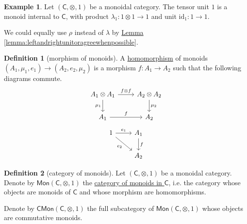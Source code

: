 \documentclass[a4paper,10pt]{scrreprt}
\newcommand{\defn}[1]{\ul{#1}}
\theoremstyle{definition}
\newtheorem{definition}{Definition}[section]
\newtheorem{example}{Example}[section]
\theoremstyle{plain}
\theoremstyle{remark}
\begin{document}
\begin{example}
  \label{eg:tensorunitisinternalmonoid}
  Let $(\mathsf{C}, \otimes, 1)$ be a monoidal category. The tensor unit $1$ is a monoid internal to $\mathsf{C}$, with product $\lambda_{1}\colon 1 \otimes 1 \to 1$ and unit $\mathrm{id}_{1}\colon 1 \to 1$.

  We could equally use $\rho$ instead of $\lambda$ by \hyperref[lemma:leftandrightunitoragreewhenpossible]{Lemma \ref*{lemma:leftandrightunitoragreewhenpossible}}.
\end{example}

\begin{definition}[morphism of monoids]
  \label{def:homomorphismofmonoids}
  A \defn{homomorphism} of monoids $(A_{1}, \mu_{1}, e_{1}) \to (A_{2}, e_{2}, \mu_{2})$ is a morphism $f\colon A_{1} \to A_{2}$ such that the following diagrams commute.
  \begin{equation*}
    \begin{tikzcd}
      A_{1} \otimes A_{1}
      \arrow[r, "f \otimes f"]
      \arrow[d, swap, "\mu_{1}"]
      & A_{2} \otimes A_{2}
      \arrow[d, "\mu_{2}"]
      \\
      A_{1} 
      \arrow[r, "f"]
      & A_{2}
    \end{tikzcd}
  \end{equation*}
  \begin{equation*}
    \begin{tikzcd}
      1
      \arrow[r, "e_{1}"]
      \arrow[rd, swap, "e_{2}"]
      & A_{1}
      \arrow[d, "f"]
      \\
      & A_{2}
    \end{tikzcd}
  \end{equation*}
\end{definition}

\begin{definition}[category of monoids]
  \label{def:categoryofmonoids}
  Let $(\mathsf{C}, \otimes, 1)$ be a monoidal category. Denote by $\mathsf{Mon}(\mathsf{C}, \otimes, 1)$ the \defn{category of monoids in $\mathsf{C}$}, i.e. the category whose objects are monoids of $\mathsf{C}$ and whose morphism are homomorphisms.

  Denote by $\mathsf{CMon}(\mathsf{C}, \otimes, 1)$ the full subcategory of $\mathsf{Mon}(\mathsf{C}, \otimes, 1)$ whose objects are commutative monoids.
\end{definition}
\end{document}
